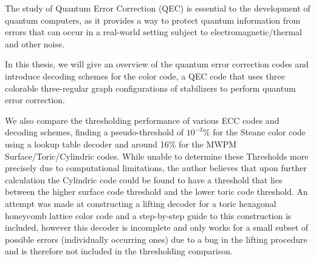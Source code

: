 The study of Quantum Error Correction (QEC) is essential to the development
of quantum computers, as it provides a way to protect quantum
information from errors that can occur in 
a real-world setting subject to electromagnetic/thermal and other noise.

In this thesis, we will give an overview of the quantum error correction codes 
and introduce decoding schemes for the color code, a QEC code that uses
three colorable three-regular graph configurations of stabilizers
to perform quantum error correction.

We also compare the thresholding performance of various ECC codes and decoding 
schemes, finding a pseudo-threshold of $10^{-3}\%$ for the Steane color code using a 
lookup table decoder and around 16\% for the MWPM Surface/Toric/Cylindric codes.
While unable to determine these Thresholds more precisely due to computational
limitations, the author believes that upon further calculation the Cylindric code
could be found to have a threshold that lies between the higher surface code threshold
and the lower toric code threshold.
An attempt was made at constructing a lifting decoder for a toric hexagonal 
honeycomb lattice color code and a step-by-step guide to this construction is 
included, however this decoder is incomplete and only works for a small subset of 
possible errors (individually occurring ones) due to a bug in 
the lifting procedure and is therefore 
not included in the thresholding comparison.
